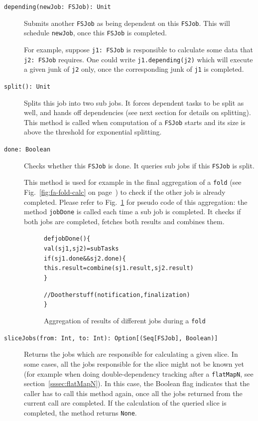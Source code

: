 \documentclass[runningheads,a4paper,fleqn]{llncs}
\begin{document}
\begin{description}
  \item[\texttt{depending(newJob: FSJob): Unit}] Submits another \texttt{FSJob} as being
    dependent on this \texttt{FSJob}. This will schedule
    \texttt{newJob}, once this \texttt{FSJob} is completed.

    For example, suppose \texttt{j1: FSJob} is responsible to
    calculate some data that \texttt{j2: FSJob} requires. One
    could write \verb|j1.depending(j2)| which will execute a given
    junk of \texttt{j2} only, once the corresponding junk of
    \texttt{j1} is completed.
  \item[\texttt{split(): Unit}] Splits this job into two
    sub jobs. It forces dependent tasks to be split as well, and hands off
    dependencies (see next section for details on splitting). This
    method is called when computation of a \texttt{FSJob} starts and
    its size is above the threshold for exponential splitting.
  \item[\texttt{done: Boolean}] Checks whether this \texttt{FSJob} is
    done. It queries sub jobs if this \texttt{FSJob} is split.

    This method is used for example in the final aggregation of a 
    \texttt{fold} (see Fig.~\ref{fig:fa-fold-calc} on
    page~\pageref{fig:fa-fold-calc}) to check if the other job is
    already completed. Please refer to Fig.~\ref{fig:fa-fold-code} for
    pseudo code of this aggregation: the method \texttt{jobDone} is
    called each time a sub job is completed. It checks if both jobs
    are completed, fetches both results and combines them.

\begin{figure}    
\begin{alltt}
{\scriptsize
def jobDone() \{
  val (sj1, sj2) = subTasks
  if (sj1.done && sj2.done) \{
    this.result = combine(sj1.result, sj2.result)
  \}
  
  // Do other stuff (notification, finalization)
\}
}
\end{alltt}
\caption{Aggregation of results of different jobs during a
  \texttt{fold}}
\label{fig:fa-fold-code}
\end{figure}

  \item[\texttt{sliceJobs(from: Int, to: Int): Option[(Seq[FSJob],
      Boolean)]}] Returns the jobs which are responsible for
    calculating a given slice. In some cases, all the jobs responsible 
    for the slice might not be known yet (for example when doing
    double-dependency tracking after a \texttt{flatMapN}, see
    section~\ref{sssec:flatMapN}). In this case, the Boolean flag
    indicates that the caller has to call this method again, once all
    the jobs returned from the current call are completed. If the
    calculation of the queried slice is completed, the method returns
    \texttt{None}.


\end{description}
\end{document}
